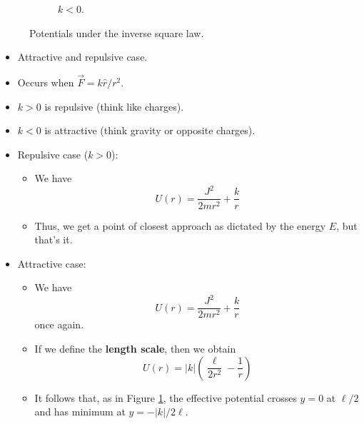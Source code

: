 \documentclass[../notes.tex]{subfiles}
\begin{document}
\begin{itemize}
\begin{figure}[H]
\begin{subfigure}[b]{0.3\linewidth}
            \caption{$k<0$.}
            \label{fig:invSqPotb}
        \end{subfigure}
        \caption{Potentials under the inverse square law.}
        \label{fig:invSqPot}
    \end{figure}
    \begin{itemize}
        \item Attractive and repulsive case.
        \item Occurs when $\vec{F}=k\hat{r}/r^2$.
        \item $k>0$ is repulsive (think like charges).
        \item $k<0$ is attractive (think gravity or opposite charges).
        \item Repulsive case ($k>0$):
        \begin{itemize}
            \item We have
            \begin{equation*}
                U(r) = \frac{J^2}{2mr^2}+\frac{k}{r}
            \end{equation*}
            \item Thus, we get a point of closest approach as dictated by the energy $E$, but that's it.
        \end{itemize}
        \item Attractive case:
        \begin{itemize}
            \item We have
            \begin{equation*}
                U(r) = \frac{J^2}{2mr^2}+\frac{k}{r}
            \end{equation*}
            once again.
            \item If we define the \textbf{length scale}, then we obtain
            \begin{equation*}
                U(r) = |k|\left( \frac{\ell}{2r^2}-\frac{1}{r} \right)
            \end{equation*}
            \item It follows that, as in Figure \ref{fig:invSqPotb}, the effective potential crosses $y=0$ at $\ell/2$ and has minimum at $y=-|k|/2\ell$.

\end{itemize}
\end{itemize}
\end{itemize}
\end{document}
